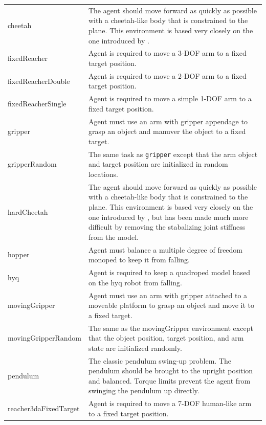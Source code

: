 \documentclass{article} %
\begin{document}
\begin{center}
\begin{longtable}{ l | p{10cm} }
cheetah                      & The agent should move forward as quickly as possible with a cheetah-like body that is constrained to the plane.  This environment is based very closely on the one introduced by \citet{wawrzynski2009real,wawrzynski2013autonomous}. \\
fixedReacher                 & Agent is required to move a 3-DOF arm to a fixed target position. \\
fixedReacherDouble           & Agent is required to move a 2-DOF arm to a fixed target position. \\
fixedReacherSingle           & Agent is required to move a simple 1-DOF arm to a fixed target position. \\
gripper                      & Agent must use an arm with gripper appendage to grasp an object and manuver the object to a fixed target.      \\
gripperRandom                & The same task as {\tt gripper} except that the arm object and target position are initialized in random locations. \\
hardCheetah                  & The agent should move forward as quickly as possible with a cheetah-like body that is constrained to the plane.  This environment is based very closely on the one introduced by \citet{wawrzynski2009real,wawrzynski2013autonomous}, but has been made much more difficult by removing the stabalizing joint stiffness from the model. \\
hopper                       & Agent must balance a multiple degree of freedom monoped to keep it from falling.      \\
hyq                          & Agent is required to keep a quadroped model based on the hyq robot from falling. \\
movingGripper                & Agent must use an arm with gripper attached to a moveable platform to grasp an object and move it to a fixed target. \\
movingGripperRandom          & The same as the movingGripper environment except that the object position, target position, and arm state are initialized randomly. \\
pendulum                     & The classic pendulum swing-up problem.  The pendulum should be brought to the upright position and balanced.  Torque limits prevent the agent from swinging the pendulum up directly. \\
reacher3daFixedTarget        & Agent is required to move a 7-DOF human-like arm to a fixed target position.      \\

\end{longtable}
\end{center}
\end{document}
